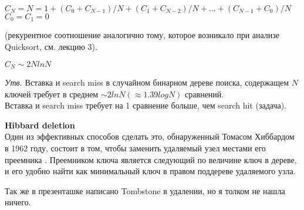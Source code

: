 \begin{center}

$C_N = N=1+(C_0+C_{N-1})/N+(C_1+C_{N-2})/N+. . .+(C_{N-1}+C_0)/N$\\
$C_0 = C_1 = 0$

\end{center}
(рекурентное соотношение аналогично тому, которое возникало при анализе Quicksort, см. лекцию 3).
\vspace{2mm}
\begin{center}
$C_N \sim 2N ln N$
\end{center}
\vspace{3mm}
\textit{Утв.} Вставка и search miss в случайном бинарном дереве
поиска, содержащем $N$ ключей требует в среднем $\sim 2 ln N (\approx 1.39 log N)$ сравнений.\\
Вставка и search miss требует на 1 сравнение больше, чем
search hit (задача).

\vspace{3mm}
{\bf Hibbard deletion}\\
Один из эффективных способов сделать это, обнаруженный Томасом Хиббардом в 1962 году, состоит в том, чтобы заменить удаляемый узел местами его преемника . Преемником ключа является следующий по величине ключ в дереве, и его удобно найти как минимальный ключ в правом поддереве удаляемого узла.

Так же в презенташке написано Tombstone в удалении, но я толком не нашла ничего.